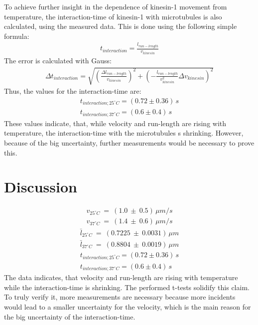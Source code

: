 \documentclass[english, %
parskip=full, %
bibliography=totoc, %
]{scrartcl}
\begin{document}
To achieve further insight in the dependence of kinesin-1 movement from temperature, the interaction-time of kinesin-1 with microtubules is also calculated, using the measured data. This is done using the following simple formula:
\begin{align*}
t_{interaction} = \frac{l_{run-length}}{v_{kinesin}}
\end{align*}
The error is calculated with Gauss:
\begin{align*}
\Delta t_{interaction} = \sqrt{(\frac{\Delta l_{run-length}}{v_{kinesin}})^2 + (- \frac{l_{run-length}}{v_{kinesin}^2} \Delta v_{kinesin})^2}
\end{align*}
Thus, the values for the interaction-time are:
\begin{align*}
t_{interaction; 25^\circ C} = (0.72 \pm 0.36)\,s \\
t_{interaction; 37^\circ C} = (0.6 \pm 0.4)\,s
\end{align*}
These values indicate, that, while velocity and run-length are rising with temperature, the interaction-time with the microtubules s shrinking. However, because of the big uncertainty, further measurements would be necessary to prove this.

\pagebreak

\section{Discussion}
\begin{align*}
v_{25^\circ C} \ = \ (1.0 \ \pm \ 0.5) \, \mu m/s \\
v_{37^\circ C} \ = \ (1.4 \ \pm \ 0.6) \, \mu m/s
\end{align*}
\begin{align*}
\bar{l} _{25^\circ C} \ = \ (0.7225 \ \pm \ 0.0031) \, \mu m \\
\bar{l} _{37^\circ C} \ = \ (0.8804 \ \pm \ 0.0019) \, \mu m
\end{align*}
\begin{align*}
t_{interaction; 25^\circ C} = (0.72 \pm 0.36)\,s \\
t_{interaction; 37^\circ C} = (0.6 \pm 0.4)\,s
\end{align*}
The data indicates, that velocity and run-length are rising with temperature while the interaction-time is shrinking. The performed t-tests solidify this claim. To truly verify it, more measurements are necessary because more incidents would lead to a smaller uncertainty for the velocity, which is the main reason for the big uncertainty of the interaction-time.
\end{document}
